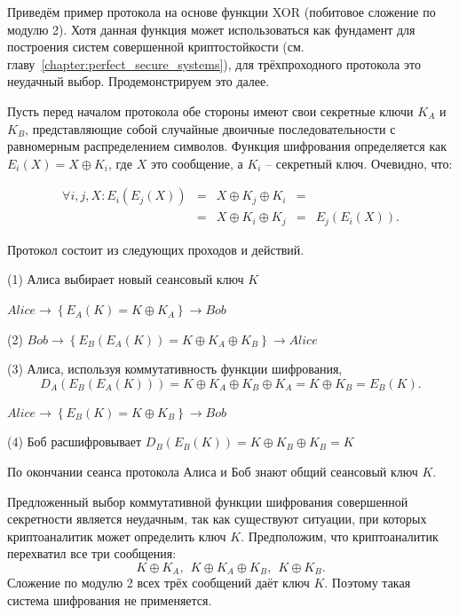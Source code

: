 Приведём пример протокола на основе функции XOR (побитовое сложение по модулю 2). Хотя данная функция может использоваться как фундамент для построения систем совершенной криптостойкости (см. главу~\ref{chapter:perfect_secure_systems}), для трёхпроходного протокола это неудачный выбор. Продемонстрируем это далее.

Пусть перед началом протокола обе стороны имеют свои секретные ключи $K_A$ и $K_B$, представляющие собой случайные двоичные последовательности с равномерным распределением символов. Функция шифрования определяется как $E_i( X ) = X \oplus K_i$, где $X$ это сообщение, а $K_i$ -- секретный ключ. Очевидно, что:

\[ \begin{matrix}
\forall i, j, X: E_i \left( E_j \left( X \right) \right) & = & X \oplus K_j \oplus K_i & = & \\ 
 & = & X \oplus K_i \oplus K_j & = & E_j \left( E_i \left( X \right) \right).
\end{matrix}
\]

Протокол состоит из следующих проходов и действий.

\begin{protocol}
    \item[(1)] Алиса выбирает новый сеансовый ключ $K$
    \item[{}] $Alice \to \left\{ E_A \left( K \right) = K \oplus K_A \right\} \to Bob$
    \item[(2)] $Bob \to \left\{ E_B \left( E_A \left( K \right) \right) = K \oplus K_A \oplus K_B \right\} \to Alice$
    \item[(3)] Алиса, используя коммутативность функции шифрования,
	\[ D_A \left( E_B \left( E_A \left( K \right) \right) \right) = K \oplus K_A \oplus K_B \oplus K_A = K \oplus K_B = E_B \left( K \right). \]
    \item[{}] $Alice \to \left\{ E_B \left( K \right) = K \oplus K_B \right\} \to Bob$
    \item[(4)] Боб расшифровывает $D_B \left( E_B \left( K \right) \right) = K \oplus K_B \oplus K_B = K$
\end{protocol}

По окончании сеанса протокола Алиса и Боб знают общий сеансовый ключ $K$.

Предложенный выбор коммутативной функции шифрования совершенной секретности является неудачным, так как существуют ситуации, при которых криптоаналитик может определить ключ $K$. Предположим, что криптоаналитик перехватил все три сообщения:
    \[ K \oplus K_A, ~~ K \oplus K_A \oplus K_B, ~~ K \oplus K_B. \]
Сложение по модулю 2 всех трёх сообщений даёт ключ $K$. Поэтому такая система шифрования не применяется.

